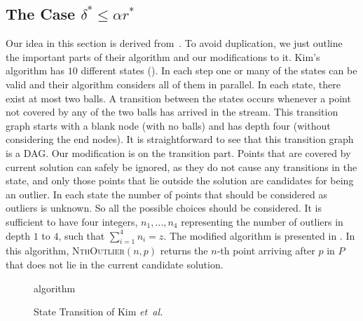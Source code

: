 \documentclass[envcountsame]{cls/cccg15}
\newcommand{\textproc}{\textsc}
\newcommand{\lee}{\leqslant}
\renewcommand{\leq}{\lee}
\newcommand{\etal}{{\em et~al.\/}}
\begin{document}

\subsection{The Case $\delta^* \leq \alpha r^*$}
\label{subsec:smaller}
Our idea in this section is derived from~\cite{ahn2014computing, kim2014improved}. To avoid duplication, we just outline the important parts of their algorithm and our modifications to it. Kim's algorithm has $10$ different states (). In each step one or many of the states can be valid and their algorithm considers all of them in parallel. In each state, there exist at most two balls. A transition between the states occurs whenever a point not covered by any of the two balls has arrived in the stream. This transition graph starts with a blank node (with no balls) and has depth four (without considering the end nodes). It is straightforward to see that this transition graph is a DAG.
Our modification is on the transition part.
Points that are covered by current solution can safely be ignored, as they do not cause any transitions in the state, and only those points that lie outside the solution are candidates for being an outlier.
In each state the number of points that should be considered as outliers is unknown. So all the possible choices should be considered. It is sufficient to have four integers, $n_1,\dots, n_4$ representing the number of outliers in depth $1$ to $4$, such that $\sum_{i=1}^{4} n_i=z$. 
The modified algorithm is presented in .
In this algorithm, \textproc{NthOutlier}$(n,p)$ returns the $n$-th point 
arriving after $p$ in $P$ that does not lie in the current candidate solution.

\begin{figure}
\centering
{}
\caption{State Transition of Kim \etal \cite{kim2014improved}} algorithm \label{fig:dag}
\end{figure}
\end{document}
